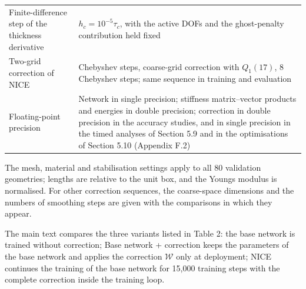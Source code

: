 \documentclass[preprint,12pt,authoryear]{elsarticle}
\begin{document}
{\begin{longtable}[]{@{}
  >{\raggedright\arraybackslash}p{}
  >{\raggedright\arraybackslash}p{}@{}}
Finite-difference step of the thickness derivative & \(h_c=10^{-5}\tau_c\), with the active DOFs and the ghost-penalty contribution held fixed \\
Two-grid correction of NICE & 8 Chebyshev steps, coarse-grid correction with \(Q_1(17)\), 8 Chebyshev steps; same sequence in training and evaluation \\
Floating-point precision & Network in single precision; stiffness matrix--vector products and energies in double precision; correction in double precision in the accuracy studies, and in single precision in the timed analyses of Section 5.9 and in the optimisations of Section 5.10 (Appendix F.2) \\
\end{longtable}}

The mesh, material and stabilisation settings apply to all 80 validation geometries; lengths are relative to the unit box, and the Young\textquotesingle s modulus is normalised. For other correction sequences, the coarse-space dimensions and the numbers of smoothing steps are given with the comparisons in which they appear.

The main text compares the three variants listed in Table 2: the base network is trained without correction; Base network + correction keeps the parameters of the base network and applies the correction \(\mathcal W\) only at deployment; NICE continues the training of the base network for 15,000 training steps with the complete correction inside the training loop.
\end{document}
